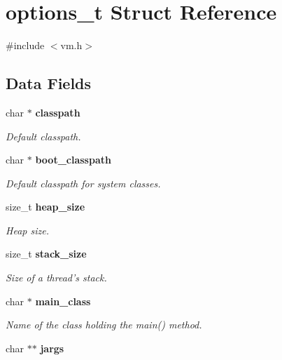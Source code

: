 \section{options\_\-t Struct Reference}
\label{structoptions__t}


{\ttfamily \#include $<$vm.h$>$}

\subsection*{Data Fields}
\begin{DoxyCompactItemize}
\item 
char $\ast$ {\bf classpath}\label{structoptions__t_a25805064903ba542cfafc13f71f12291}

\begin{DoxyCompactList}\small\item\em Default classpath. \item\end{DoxyCompactList}\item 
char $\ast$ {\bf boot\_\-classpath}\label{structoptions__t_a323a705e463ed6fc55a5ee0deca34a71}

\begin{DoxyCompactList}\small\item\em Default classpath for system classes. \item\end{DoxyCompactList}\item 
size\_\-t {\bf heap\_\-size}\label{structoptions__t_a574bbab7839c0d1a9a23746d94f2708e}

\begin{DoxyCompactList}\small\item\em Heap size. \item\end{DoxyCompactList}\item 
size\_\-t {\bf stack\_\-size}\label{structoptions__t_a23196597ea279ddb3ade434cecf3d883}

\begin{DoxyCompactList}\small\item\em Size of a thread's stack. \item\end{DoxyCompactList}\item 
char $\ast$ {\bf main\_\-class}\label{structoptions__t_a8d350701fafdaddf780a75d2c2245061}

\begin{DoxyCompactList}\small\item\em Name of the class holding the main() method. \item\end{DoxyCompactList}\item 
char $\ast$$\ast$ {\bf jargs}\label{structoptions__t_ac3cd0b91ac6ae4318a4cab9eb6d39e7f}


\end{DoxyCompactItemize}
